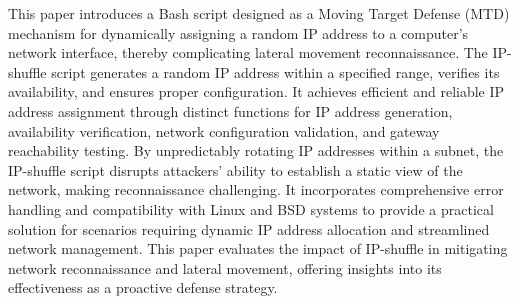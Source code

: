 This paper introduces a Bash script designed as a Moving Target Defense (MTD) mechanism for dynamically assigning a random IP address to a computer’s network interface, thereby complicating lateral movement reconnaissance. The IP-shuffle script generates a random IP address within a specified range, verifies its availability, and ensures proper configuration. It achieves efficient and reliable IP address assignment through distinct functions for IP address generation, availability verification, network configuration validation, and gateway reachability testing. By unpredictably rotating IP addresses within a subnet, the IP-shuffle script disrupts attackers' ability to establish a static view of the network, making reconnaissance challenging. It incorporates comprehensive error handling and compatibility with Linux and BSD systems to provide a practical solution for scenarios requiring dynamic IP address allocation and streamlined network management. This paper evaluates the impact of IP-shuffle in mitigating network reconnaissance and lateral movement, offering insights into its effectiveness as a proactive defense strategy.